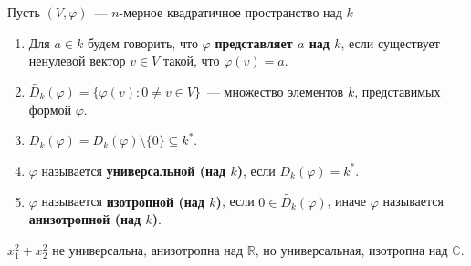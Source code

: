 \documentclass[a4paper,oneside,12pt]{article}
\theoremstyle{plain} { \swapnumbers
\newtheorem{theorem}{Теорема}[subsection]
\newtheorem{corollary}[theorem]{Следствие}
\newtheorem{lemma}[theorem]{Лемма}
\newtheorem{proposition}[theorem]{Утверждение}
\newtheorem{claim}[theorem]{Факт}
}
\theoremstyle{definition} { \swapnumbers
\newtheorem{definition}[theorem]{Определение}
\newtheorem{notation}[theorem]{Обозначение}
\newtheorem{remark}[theorem]{Замечание}
\newtheorem{remarks}[theorem]{Замечания}
\newtheorem{example}[theorem]{Пример}
\newtheorem{examples}[theorem]{Примеры}
\newtheorem{sssection}[theorem]{}
}
\def\tilde{\widetilde}
\def\ph{\varphi}
\begin{document}
Пусть $(V,\ph)$~--- $n$-мерное квадратичное пространство над $k$
\begin{enumerate}
\item Для $a\in k$ будем говорить, что $\ph$ {\bf представляет $a$ над $k$}, если
существует ненулевой вектор $v\in V$ такой, что $\ph(v)=a$.
\item $\tilde{D_k}(\ph)=\{\ph(v):0\neq v\in V\}$~--- множество элементов $k$, представимых формой $\ph$.
\item $D_k(\ph)=D_k(\ph)\setminus\{0\}\subseteq k^*$.
\item $\ph$ называется {\bf универсальной (над $k$)}, если $D_k(\ph)=k^*$.
\item $\ph$ называется {\bf изотропной (над $k$)}, если $0\in\tilde{D_k}(\ph)$, иначе $\ph$
называется {\bf анизотропной (над $k$)}.
\end{enumerate}

\begin{example}
$x_1^2+x_2^2$ не универсальна, анизотропна над $\mathbb R$, но универсальная, изотропна
над $\mathbb C$.
\end{example}
\end{document}
